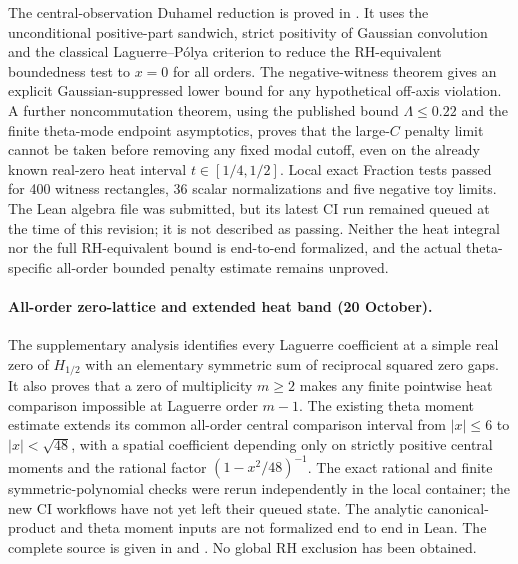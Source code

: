 The central-observation Duhamel reduction is proved in
.
It uses the unconditional positive-part sandwich, strict
positivity of Gaussian convolution and the classical
Laguerre--P\'olya criterion to reduce the RH-equivalent
boundedness test to $x=0$ for all orders.
The negative-witness theorem gives an explicit
Gaussian-suppressed lower bound for any hypothetical
off-axis violation. A further noncommutation theorem,
using the published bound $\Lambda\le0.22$ and the
finite theta-mode endpoint asymptotics, proves that the
large-$C$ penalty limit cannot be taken before removing
any fixed modal cutoff, even on the already known
real-zero heat interval $t\in[1/4,1/2]$.
Local exact Fraction tests passed for 400 witness
rectangles, 36 scalar normalizations and five negative
toy limits. The Lean algebra file
 was submitted,
but its latest CI run remained queued at the time of
this revision; it is not described as passing.
Neither the heat integral nor the full RH-equivalent
bound is end-to-end formalized, and the actual
theta-specific all-order bounded penalty estimate
remains unproved.


\paragraph{All-order zero-lattice and extended heat band (20 October).}
The supplementary analysis identifies every Laguerre coefficient
at a simple real zero of $H_{1/2}$ with an elementary symmetric
sum of reciprocal squared zero gaps. It also proves that
a zero of multiplicity $m\ge2$ makes any finite
pointwise heat comparison impossible at Laguerre order $m-1$.
The existing theta moment estimate extends its common
all-order central comparison interval from $|x|\le6$
to $|x|<\sqrt{48}$, with a spatial coefficient depending
only on strictly positive central moments and the rational
factor $(1-x^2/48)^{-1}$.
The exact rational and finite symmetric-polynomial checks
were rerun independently in the local container;
the new CI workflows have not yet left their queued state.
The analytic canonical-product and theta moment inputs
are not formalized end to end in Lean.
The complete source is given in
and .
No global RH exclusion has been obtained.


